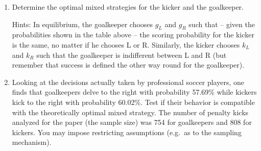 \begin{enumerate}
\begin{enumerate}
\item Determine the optimal mixed strategies for the kicker and the
goalkeeper.

Hints: In equilibrium, the goalkeeper chooses $g_{L}$ and $g_{R}$ such that
-- given the probabilities shown in the table above -- the scoring
probability for the kicker is the same, no matter if he chooses L or R.
Similarly, the kicker chooses $k_{L}$ and $k_{R}$ such that the goalkeeper
is indifferent between L and R (but remember that success is defined
the other way round for the goalkeeper).

\item Looking at the decisions actually taken by professional soccer
players, one finds that goalkeepers delve to the right with probability
57.69\% while kickers kick to the right with probability 60.02\%. Test if
their behavior is compatible with the theoretically optimal mixed strategy.
The number of penalty kicks analyzed for the paper (the sample size) was 
754 for goalkeepers and 808 for kickers. You may impose restricting 
assumptions (e.g.~as to the sampling mechanism).
\end{enumerate}
\end{enumerate}
